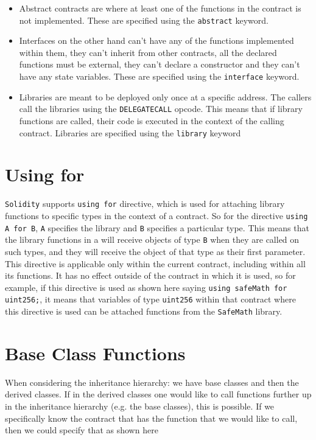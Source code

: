 \begin{itemize}
\item Abstract contracts are where at least one of the functions in the contract is not implemented. These are specified using the \verb|abstract| keyword.
\item Interfaces on the other hand can't have any of the functions implemented within them, they can't inherit from other contracts, all the declared functions must be external, they can't declare a constructor and they can't have any state variables. These are specified using the \verb|interface| keyword.
\item Libraries are meant to be deployed only once at a specific address. The callers call the libraries using the \verb|DELEGATECALL| opcode. This means that if library functions are called, their code is executed in the context of the calling contract. Libraries are specified using the \verb|library| keyword
\end{itemize}


\section{Using for}
\verb|Solidity| supports \verb|using for| directive, which is used for attaching library functions to specific types in the context of a contract. So for the directive \verb|using A for B|, \verb|A| specifies the library and \verb|B| specifies a particular type. This means that the library functions in a will receive objects of type \verb|B| when they are called on such types, and they will receive the object of that type as their first parameter. This directive is applicable only within the current contract, including within all its functions. It has no effect outside of the contract in which it is used, so for example, if this directive is used as shown here saying \verb|using safeMath for uint256;|, it means that variables of type \verb|uint256| within that contract where this directive is used can be attached functions from the \verb|SafeMath| library.

\section{Base Class Functions}
When considering the inheritance hierarchy: we have base classes and then the derived classes. If in the derived classes one would like to call functions further up in the inheritance hierarchy (e.g. the base classes), this is possible. If we specifically know the contract that has the function that we would like to call, then we could specify that as shown here

